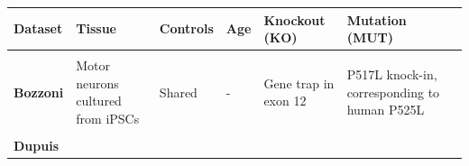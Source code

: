 \begin{longtable}[t]{@{}llllll@{}}
	\begin{minipage}[t]{0.14\columnwidth}\raggedright\strut
		{\textbf{Dataset}}\strut
	\end{minipage} & \begin{minipage}[t]{0.14\columnwidth}\raggedright\strut
		{\textbf{Tissue}}\strut
	\end{minipage} & \begin{minipage}[t]{0.12\columnwidth}\raggedright\strut
		{\textbf{Controls}}\strut
	\end{minipage} & \begin{minipage}[t]{0.10\columnwidth}\raggedright\strut
		{\textbf{Age}}\strut
	\end{minipage} & \begin{minipage}[t]{0.14\columnwidth}\raggedright\strut
		{\textbf{Knockout (KO)}}\strut
	\end{minipage} & \begin{minipage}[t]{0.14\columnwidth}\raggedright\strut
		{\textbf{Mutation (MUT)}}\strut
	\end{minipage}\tabularnewline\toprule \\[-0.3cm] 
	\begin{minipage}[t]{0.16\columnwidth}\raggedright\strut
		{\textbf{Bozzoni}}
		{\footnotesize\citep{Capauto2018}}\strut
	\end{minipage} & \begin{minipage}[t]{0.14\columnwidth}\raggedright\strut
		{Motor neurons}
		{cultured from iPSCs}\strut
	\end{minipage} & \begin{minipage}[t]{0.12\columnwidth}\raggedright\strut
		{Shared}\strut
	\end{minipage} & \begin{minipage}[t]{0.10\columnwidth}\raggedright\strut
		{-}\strut
	\end{minipage} & \begin{minipage}[t]{0.16\columnwidth}\raggedright\strut
		{Gene trap in exon 12}	\strut
	\end{minipage} & \begin{minipage}[t]{0.16\columnwidth}\raggedright\strut
		{P517L knock-in,}
		{corresponding to human P525L}\strut
	\end{minipage}\tabularnewline \\
	\begin{minipage}[t]{0.16\columnwidth}\raggedright\strut
		{\textbf{Dupuis}}
		{\footnotesize\citep{Scekic-zahirovic2016}}\strut

\end{minipage}
\end{longtable}

